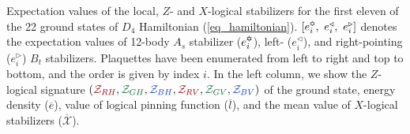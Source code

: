 \begin {table*}
\begin{center}
{\begin{tabular}{c @{\ }@{\ }|@{\ }@{\ } c }
\end{tabular}}
    \egroup
    \end{center}\caption{Expectation values of the local, $Z$- and $X$-logical stabilizers for the first eleven of the 22 ground states of $D_4$ Hamiltonian (\ref{eq_hamiltonian}). $[e^\text{\ding{65}}_i,\ e^{\triangleleft}_i,\ e^{\triangleright}_i]$ denotes the expectation values of 12-body $A_s$ stabilizer ($e^\text{\ding{65}}_i$), left- ($e^{\triangleleft}_i$), and right-pointing ($e^{\triangleright}_i $) $B_t$ stabilizers. Plaquettes have been enumerated from left to right and top to bottom, and the order is given by index $i$. In the left column, we show the $Z$-logical signature $(\red{\mathcal{Z}_{RH}},\green{\mathcal{Z}_{GH}},\blue{\mathcal{Z}_{BH}},\red{\mathcal{Z}_{RV}},\green{\mathcal{Z}_{GV}},\blue{\mathcal{Z}_{BV}})$ of the ground state, energy density ($\overline{e}$), value of logical pinning function ($\overline{l}$), and the mean value of $X$-logical stabilizers ($\overline{\mathcal{X}}$).}\label{table:22_gss_a}\end {table*}
        
